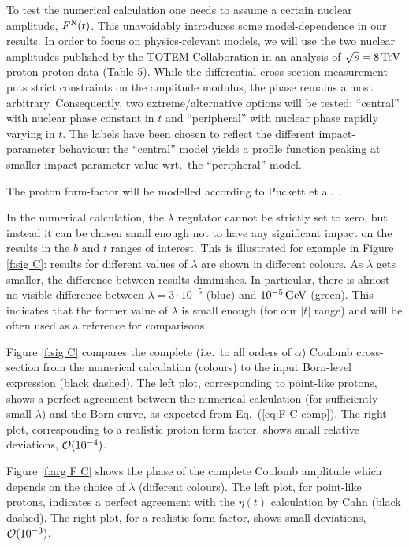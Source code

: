 \documentclass{appolb}
\def\un#1{\,{\rm #1}}
\begin{document}
To test the numerical calculation one needs to assume a certain nuclear amplitude, $F^{\rm N}(t)$. This unavoidably introduces some model-dependence in our results. In order to focus on physics-relevant models, we will use the two nuclear amplitudes published by the TOTEM Collaboration in an analysis of $\sqrt s = 8\un{TeV}$ proton-proton data \cite{totem-8tev-1km} (Table 5). While the differential cross-section measurement puts strict constraints on the amplitude modulus, the phase remains almost arbitrary. Consequently, two extreme/alternative options will be tested: ``central'' with nuclear phase constant in $t$ and ``peripheral'' with nuclear phase rapidly varying in $t$. The labels have been chosen to reflect the different impact-parameter behaviour: the ``central'' model yields a profile function peaking at smaller impact-parameter value wrt.~the ``peripheral'' model.

The proton form-factor will be modelled according to Puckett et al.~\cite{puckett}.

In the numerical calculation, the $\lambda$ regulator cannot be strictly set to zero, but instead it can be chosen small enough not to have any significant impact on the results in the $b$ and $t$ ranges of interest. This is illustrated for example in Figure \ref{f:sig C}: results for different values of $\lambda$ are shown in different colours. As $\lambda$ gets smaller, the difference between results diminishes. In particular, there is almost no visible difference between $\lambda = 3\cdot 10^{-5}$ (blue) and $10^{-5}\un{GeV}$ (green). This indicates that the former value of $\lambda$ is small enough (for our $|t|$ range) and will be often used as a reference for comparisons.

Figure \ref{f:sig C} compares the complete (i.e.~to all orders of $\alpha$) Coulomb cross-section from the numerical calculation (colours) to the input Born-level expression (black dashed). The left plot, corresponding to point-like protons, shows a perfect agreement between the numerical calculation (for sufficiently small $\lambda$) and the Born curve, as expected from Eq.~(\ref{eq:F C comp}). The right plot, corresponding to a realistic proton form factor, shows small relative deviations, ${\cal O}(10^{-4})$.

Figure \ref{f:arg F C} shows the phase of the complete Coulomb amplitude which depends on the choice of $\lambda$ (different colours). The left plot, for point-like protons, indicates a perfect agreement with the $\eta(t)$ calculation by Cahn (black dashed). The right plot, for a realistic form factor, shows small deviations, ${\cal O}(10^{-3})$.
\end{document}
